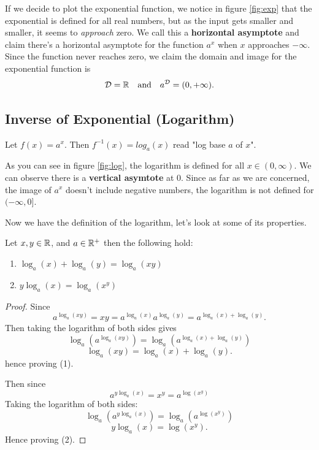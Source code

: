 If we decide to plot the exponential function, we notice in figure \eqref{fig:exp} that the exponential is defined for all real numbers, but as the input gets smaller and smaller, it seems to \textit{approach} zero. We call this a \textbf{horizontal asymptote} and claim there's a horizontal asymptote for the function $a^x$ when $x$ approaches $-\infty$. Since the function never reaches zero, we claim the domain and image for the exponential function is
$$\mathcal{D}=\mathbb{R} \quad\text{and}\quad a^\mathcal{D}=(0,+\infty).$$

\subsection{Inverse of Exponential (Logarithm)}
\begin{define}
	Let $f(x)=a^x$. Then $f^{-1}(x)=log_a(x)$ read "log base $a$ of $x$".\footnotemark
\end{define}
\begin{figure}[h]
	\centering
	\caption{}
	\label{fig:log}
\end{figure}
As you can see in figure \eqref{fig:log}, the logarithm is defined for all $x\in(0,\infty)$. We can observe there is a \textbf{vertical asymtote} at $0$.
Since as far as we are concerned, the image of $a^x$ doesn't include negative numbers, the logarithm is not defined for $(-\infty,0]$.

Now we have the definition of the logarithm, let's look at some of its properties.
\begin{theorem}
	Let $x,y\in\mathbb{R}$, and $a\in\mathbb{R}^{+}$ then the following hold:
	\begin{enumerate}
		\item $\log_a(x)+\log_a(y)=\log_a(xy)$
		\item $y\log_a(x)=\log_a(x^y)$
	\end{enumerate}
\end{theorem}
\begin{proof}
	Since
	$$a^{\log_a(xy)}=xy=a^{\log_a(x)}a^{\log_a(y)}=a^{\log_a(x)+\log_a(y)}.$$
	Then taking the logarithm of both sides gives
	$$\log_a(a^{\log_a(xy)})=\log_a(a^{\log_a(x)+\log_a(y)})$$
	$$\log_a(xy)=\log_a(x)+\log_a(y).$$
	hence proving (1).

	Then since
	$$a^{y\log_a(x)}=x^y=a^{\log(x^y)}$$
	Taking the logarithm of both sides:
	$$\log_a(a^{y\log_a(x)})=\log_a(a^{\log(x^y)})$$
	$$y\log_a(x)=\log(x^y).$$
	Hence proving (2).
\end{proof}

